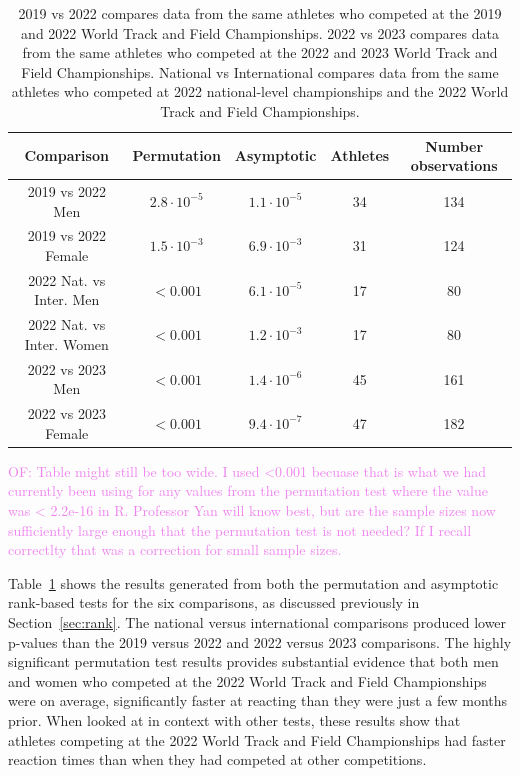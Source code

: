 \documentclass[12pt, letterpaper]{article}
\newcommand{\of}[1]{\textcolor{violet}{OF: #1}}
\begin{document}
\begin{table}
  \centering
  \caption{2019 vs 2022 compares data from the same athletes who competed at the
  2019 and 2022 World Track and Field Championships. 2022 vs 2023 compares data
  from the same athletes who competed at the 2022 and 2023 World Track and Field
  Championships. National vs International compares data from the same athletes
  who competed at 2022 national-level championships and the 2022 World Track and
  Field Championships.}
  \begin{tabular}{c c c c c} 
   \toprule
   Comparison & Permutation & Asymptotic & Athletes & Number observations  \\ 
   \midrule
   2019 vs 2022 Men & $2.8 \cdot 10^{-5}$ & $1.1 \cdot 10^{-5}$ & 34 & 134 \\
   2019 vs 2022 Female & $ 1.5 \cdot 10^{-3}$ & $6.9 \cdot 10^{-3}$ & 31 & 124 \\
   2022 Nat. vs Inter. Men & $<0.001$ & $ 6.1 \cdot 10^{-5}$ & 17 & 80 \\
   2022 Nat. vs Inter. Women & $<0.001$ & $ 1.2 \cdot 10^{-3}$ & 17 & 80 \\
   2022 vs 2023 Men & $<0.001$ & $1.4 \cdot 10^{-6}$ & 45 & 161 \\
   2022 vs 2023 Female & $<0.001$ & $9.4 \cdot 10^{-7}$ & 47 & 182 \\
   \bottomrule
  \end{tabular}
  \label{tab:Clusrankresults}
\end{table}
\of{Table might still be too wide.  I used <0.001 becuase that is what we
had currently been using for any values from the permutation test where the value
was < 2.2e-16 in R.  Professor Yan will know best, but are the sample sizes now
sufficiently large enough that the permutation test is not needed? If I recall
correctlty that was a correction for small sample sizes.}

Table~\ref{tab:Clusrankresults} shows the results generated from both the 
permutation and asymptotic rank-based tests for the six comparisons, 
as discussed previously in Section~\ref{sec:rank}. The national versus international
comparisons produced lower p-values than the 2019 versus 2022 and 2022 versus 2023
comparisons. The highly significant permutation test results
provides substantial evidence that both men and women who competed at the
2022 World Track and Field Championships were on average, significantly faster
at reacting than they were just a few months prior. When looked at in context
with other tests, these results show that athletes competing at the 2022 World
Track and Field Championships had faster reaction times than when they had
competed at other competitions.
\end{document}
